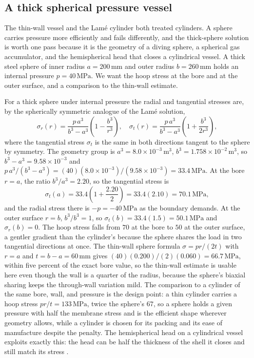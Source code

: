 \subsection{A thick spherical pressure vessel}

The thin-wall vessel and the Lam\'e cylinder both treated cylinders. A
sphere carries pressure more efficiently and fails differently, and the
thick-sphere solution is worth one pass because it is the geometry of a
diving sphere, a spherical gas accumulator, and the hemispherical head
that closes a cylindrical vessel. A thick steel sphere of inner radius
$a = 200\,\si{\milli\meter}$ and outer radius $b = 260\,\si{\milli\meter}$
holds an internal pressure $p = 40\,\text{MPa}$. We want the hoop stress
at the bore and at the outer surface, and a comparison to the thin-wall
estimate.

For a thick sphere under internal pressure the radial and tangential
stresses are, by the spherically symmetric analogue of the Lam\'e
solution,
\[
\sigma_r(r) = \frac{p\,a^3}{b^3 - a^3}\left(1 - \frac{b^3}{r^3}\right),
\quad \sigma_t(r) = \frac{p\,a^3}{b^3 - a^3}\left(1 + \frac{b^3}{2r^3}
\right),
\]
where the tangential stress $\sigma_t$ is the same in both directions
tangent to the sphere by symmetry. The geometry group is $a^3 = 8.0\times
10^{-3}\,\si{\meter}^3$, $b^3 = 1.758\times 10^{-2}\,\si{\meter}^3$, so
$b^3 - a^3 = 9.58\times 10^{-3}$ and $p\,a^3/(b^3 - a^3) = (40)(8.0\times
10^{-3})/(9.58\times 10^{-3}) = 33.4\,\text{MPa}$. At the bore $r = a$,
the ratio $b^3/a^3 = 2.20$, so the tangential stress is
\[
\sigma_t(a) = 33.4\left(1 + \frac{2.20}{2}\right) = 33.4(2.10) = 70.1\,
\text{MPa},
\]
and the radial stress there is $-p = -40\,\text{MPa}$ as the boundary
demands. At the outer surface $r = b$, $b^3/b^3 = 1$, so $\sigma_t(b) =
33.4(1.5) = 50.1\,\text{MPa}$ and $\sigma_r(b) = 0$. The hoop stress
falls from $70$ at the bore to $50$ at the outer surface, a gentler
gradient than the cylinder's because the sphere shares the load in two
tangential directions at once. The thin-wall sphere formula $\sigma =
pr/(2t)$ with $r = a$ and $t = b - a = 60\,\si{\milli\meter}$ gives
$(40)(0.200)/(2)(0.060) = 66.7\,\text{MPa}$, within five percent of the
exact bore value, so the thin-wall estimate is usable here even though
the wall is a quarter of the radius, because the sphere's biaxial sharing
keeps the through-wall variation mild. The comparison to a cylinder of the
same bore, wall, and pressure is the design point: a thin cylinder carries
a hoop stress $pr/t = 133\,\text{MPa}$, twice the sphere's $67$, so a
sphere holds a given pressure with half the membrane stress and is the
efficient shape wherever geometry allows, while a cylinder is chosen for
its packing and its ease of manufacture despite the penalty. The
hemispherical head on a cylindrical vessel exploits exactly this: the
head can be half the thickness of the shell it closes and still match its
stress \cite[ch.~10]{text:crandall-mech-of-solids}.

